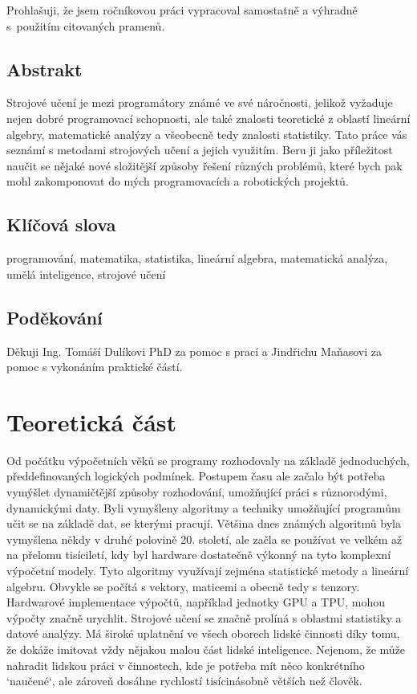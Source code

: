\documentclass[a4paper,11pt, oneside]{book} \usepackage[czech]{babel}
\begin{document}
	\noindent
	Prohlašuji, že jsem ročníkovou práci vypracoval samostatně
	a výhradně s použitím citovaných pramenů.


	\newpage
	\section*{Abstrakt}

	Strojové učení je mezi programátory známé ve své náročnosti, jelikož
	vyžaduje nejen dobré programovací schopnosti, ale také znalosti
	teoretické z oblastí lineární algebry, matematické analýzy a všeobecně tedy
	znalosti statistiky.
	Tato práce vás seznámí s metodami strojových učení a jejich využitím.
	Beru ji jako příležitost naučit se nějaké
	nové složitější způsoby řešení různých problémů, které bych pak mohl
	zakomponovat do mých programovacích a robotických projektů.

	\section*{Klíčová slova}

	programování, matematika, statistika, lineární algebra, matematická analýza, umělá inteligence, strojové učení



	\newpage
	\section*{Poděkování}
	Děkuji Ing. Tomáší Dulíkovi PhD za pomoc s prací a Jindřichu Maňasovi za pomoc s vykonáním praktické částí.

	\tableofcontents

	\clearpage
	\pagestyle{fancy}

	\chapter{Teoretická část}

	Od počátku výpočetních věků se programy rozhodovaly na základě jednoduchých,
	předdefinovaných logických podmínek. Postupem času ale začalo být potřeba
	vymýšlet dynamičtější způsoby rozhodování, umožňující práci s různorodými,
	dynamickými daty. Byli vymyšleny algoritmy a techniky umožňující programům učit
	se na základě dat, se kterými pracují. Většina dnes známých algoritmů byla
	vymyšlena někdy v druhé polovině 20. století, ale začla se
	používat ve velkém až na přelomu tisíciletí, kdy byl hardware
	dostatečně výkonný na tyto komplexní výpočetní modely.
	Tyto algoritmy využívají zejména statistické metody a lineární algebru.
	Obvykle se počítá s vektory, maticemi a obecně tedy s tenzory. Hardwarové
	implementace výpočtů, například jednotky GPU a TPU, mohou výpočty značně
	urychlit. Strojové učení se značně prolíná s oblastmi statistiky a datové
	analýzy. Má široké uplatnění ve všech oborech lidské činnosti díky tomu, že
	dokáže imitovat vždy nějakou malou část lidské inteligence. Nejenom, že může
	nahradit lidskou práci v činnostech, kde je potřeba mít něco konkrétního
	`naučené`, ale zároveň dosáhne rychlostí tisícinásobně větších než člověk.
\end{document}
